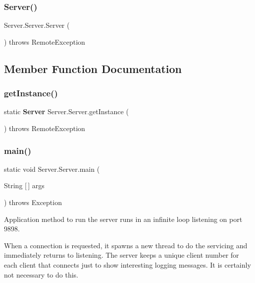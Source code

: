 \subsubsection{Server()}
{\footnotesize\ttfamily Server.\+Server.\+Server (\begin{DoxyParamCaption}{ }\end{DoxyParamCaption}) throws Remote\+Exception\hspace{0.3cm}{\ttfamily [package]}}



\subsection{Member Function Documentation}
\mbox{\label{class_server_1_1_server_a56fe649edc414c3ae70b4fbc1f0ba755}} 
\subsubsection{get\+Instance()}
{\footnotesize\ttfamily static \textbf{ Server} Server.\+Server.\+get\+Instance (\begin{DoxyParamCaption}{ }\end{DoxyParamCaption}) throws Remote\+Exception\hspace{0.3cm}{\ttfamily [static]}}

\mbox{\label{class_server_1_1_server_ab692a877dac277cf3c8276cd610fd6f3}} 
\subsubsection{main()}
{\footnotesize\ttfamily static void Server.\+Server.\+main (\begin{DoxyParamCaption}\item[{String [$\,$]}]{args }\end{DoxyParamCaption}) throws Exception\hspace{0.3cm}{\ttfamily [static]}}



Application method to run the server runs in an infinite loop listening on port 9898. 

When a connection is requested, it spawns a new thread to do the servicing and immediately returns to listening. The server keeps a unique client number for each client that connects just to show interesting logging messages. It is certainly not necessary to do this. \mbox{\label{class_server_1_1_server_a101c9ad2973f6348d03017a13e230def}} 
